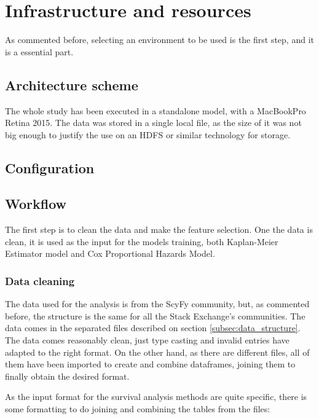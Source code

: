 \documentclass[11pt]{book} %
\begin{document}
\chapter{Infrastructure and resources}
  \label{sec:infrastructure_and_resources}

  As commented before, selecting an environment to be used is the first step, and it is a essential part.

  \section{Architecture scheme}

    The whole study has been executed in a standalone model, with a MacBookPro Retina 2015. The data was stored in a single local file, as the size of it was not big enough to justify the use on an HDFS or similar technology for storage.

  \section{Configuration}



  \section{Workflow}

    The first step is to clean the data and make the feature selection. One the data is clean, it is used as the input for the models training, both Kaplan-Meier Estimator model and Cox Proportional Hazards Model.




  \subsection{Data cleaning}

    The data used for the analysis is from the ScyFy community, but, as commented before, the structure is the same for all the Stack Exchange's communities. The data comes in the separated files described on section \ref{subsec:data_structure}. The data comes reasonably clean, just type casting and invalid entries have adapted to the right format. On the other hand, as there are different files, all of them have been imported to create and combine dataframes, joining them to finally obtain the desired format.

    As the input format for the survival analysis methods are quite specific, there is some formatting to do joining and combining the tables from the files:
\end{document}
